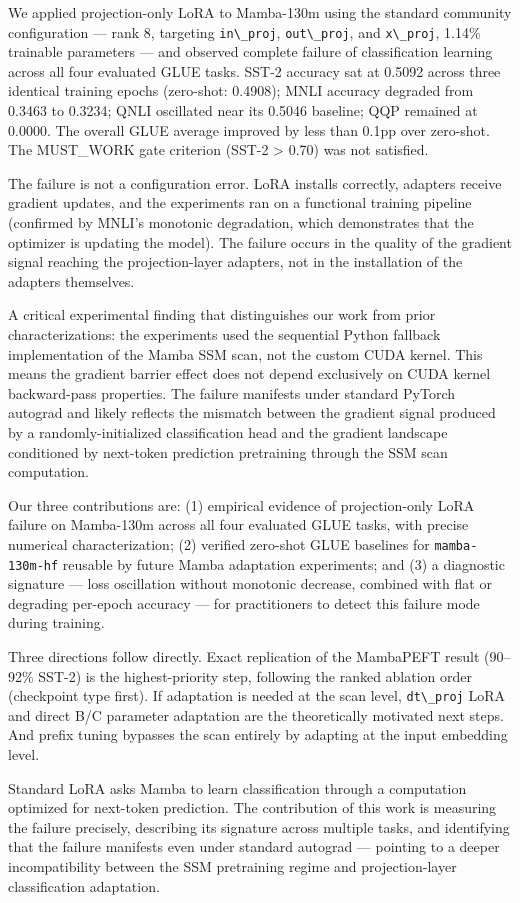 
We applied projection-only LoRA to Mamba-130m using the standard community configuration --- rank 8, targeting \texttt{in\textbackslash \_proj}, \texttt{out\textbackslash \_proj}, and \texttt{x\textbackslash \_proj}, 1.14\% trainable parameters --- and observed complete failure of classification learning across all four evaluated GLUE tasks. SST-2 accuracy sat at 0.5092 across three identical training epochs (zero-shot: 0.4908); MNLI accuracy degraded from 0.3463 to 0.3234; QNLI oscillated near its 0.5046 baseline; QQP remained at 0.0000. The overall GLUE average improved by less than 0.1pp over zero-shot. The MUST\_WORK gate criterion (SST-2 > 0.70) was not satisfied.

The failure is not a configuration error. LoRA installs correctly, adapters receive gradient updates, and the experiments ran on a functional training pipeline (confirmed by MNLI's monotonic degradation, which demonstrates that the optimizer is updating the model). The failure occurs in the quality of the gradient signal reaching the projection-layer adapters, not in the installation of the adapters themselves.

A critical experimental finding that distinguishes our work from prior characterizations: the experiments used the sequential Python fallback implementation of the Mamba SSM scan, not the custom CUDA kernel. This means the gradient barrier effect does not depend exclusively on CUDA kernel backward-pass properties. The failure manifests under standard PyTorch autograd and likely reflects the mismatch between the gradient signal produced by a randomly-initialized classification head and the gradient landscape conditioned by next-token prediction pretraining through the SSM scan computation.

Our three contributions are: (1) empirical evidence of projection-only LoRA failure on Mamba-130m across all four evaluated GLUE tasks, with precise numerical characterization; (2) verified zero-shot GLUE baselines for \texttt{mamba-130m-hf} reusable by future Mamba adaptation experiments; and (3) a diagnostic signature --- loss oscillation without monotonic decrease, combined with flat or degrading per-epoch accuracy --- for practitioners to detect this failure mode during training.

Three directions follow directly. Exact replication of the MambaPEFT result (90--92\% SST-2) is the highest-priority step, following the ranked ablation order (checkpoint type first). If adaptation is needed at the scan level, \texttt{dt\textbackslash \_proj} LoRA and direct B/C parameter adaptation are the theoretically motivated next steps. And prefix tuning bypasses the scan entirely by adapting at the input embedding level.

Standard LoRA asks Mamba to learn classification through a computation optimized for next-token prediction. The contribution of this work is measuring the failure precisely, describing its signature across multiple tasks, and identifying that the failure manifests even under standard autograd --- pointing to a deeper incompatibility between the SSM pretraining regime and projection-layer classification adaptation.

